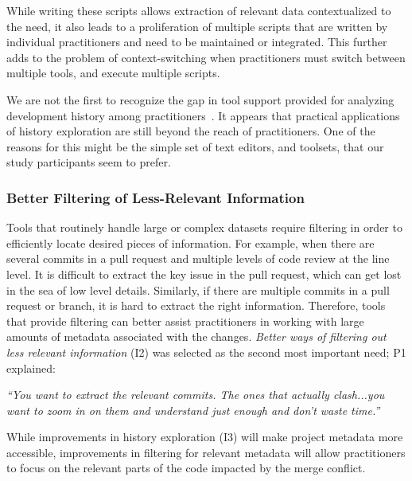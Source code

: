 While writing these scripts allows extraction of relevant data contextualized to the need, it also leads to a proliferation of multiple scripts that are written by individual practitioners and need to be maintained or integrated.
This further adds to the problem of context-switching when practitioners must switch between multiple tools, and execute multiple scripts.

We are not the first to recognize the gap in tool support provided for analyzing development history among practitioners~\cite{Mihai_lenses, sun2015informationhistory, guo2016cold-start, yan2014miningcontracts}. 
It appears that practical applications of history exploration are still beyond the reach of practitioners. 
One of the reasons for this might be the simple set of text editors, and toolsets, that our study participants seem to prefer.

\subsubsection{Better Filtering of Less-Relevant Information}\label{better_filtering}
Tools that routinely handle large or complex datasets require filtering in order to efficiently locate desired pieces of information.
For example, when there are several commits in a pull request and multiple levels of code review at the line level.
It is difficult to extract the key issue in the pull request, which can get lost in the sea of low level details. Similarly, if there are multiple commits in a pull request or branch, it is hard to extract the right information.
Therefore, tools that provide filtering can better assist practitioners in working with large amounts of metadata associated with the changes.
\textit{Better ways of filtering out less relevant information} (I2) was selected as the second most important need; P1 explained:
\begin{quoting}
\textit{``You want to extract the relevant commits. The ones that actually clash...you want to zoom in on them and understand just enough and don't waste time.''}
\end{quoting}

While improvements in history exploration (I3) will make project metadata more accessible, improvements in filtering for relevant metadata will allow practitioners to focus on the relevant parts of the code impacted by the merge conflict.

